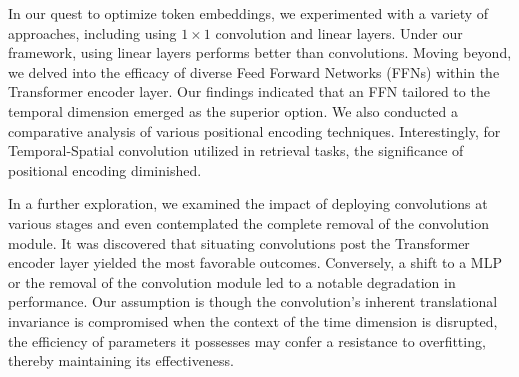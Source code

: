 \documentclass{article}
\begin{document}
In our quest to optimize token embeddings, we experimented with a variety of approaches, including using $1 \times 1$ convolution and linear layers. Under our framework, using linear layers performs better than convolutions. Moving beyond, we delved into the efficacy of diverse Feed Forward Networks (FFNs) within the Transformer encoder layer. Our findings indicated that an FFN tailored to the temporal dimension emerged as the superior option. We also conducted a comparative analysis of various positional encoding techniques. Interestingly, for Temporal-Spatial convolution utilized in retrieval tasks, the significance of positional encoding diminished. 


In a further exploration, we examined the impact of deploying convolutions at various stages and even contemplated the complete removal of the convolution module. It was discovered that situating convolutions post the Transformer encoder layer yielded the most favorable outcomes. Conversely, a shift to a MLP or the removal of the convolution module led to a notable degradation in performance. Our assumption is though the convolution's inherent translational invariance is compromised when the context of the time dimension is disrupted, the efficiency of parameters it possesses may confer a resistance to overfitting, thereby maintaining its effectiveness.
\end{document}
